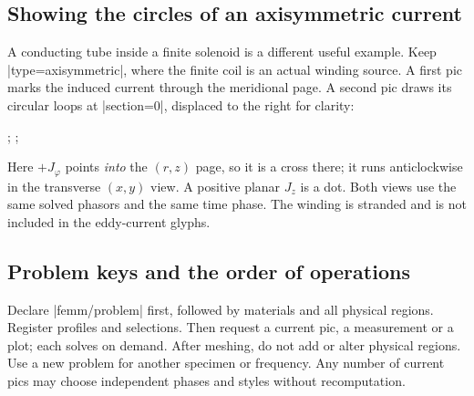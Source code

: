 \subsection{Showing the circles of an axisymmetric current}
A conducting tube inside a finite solenoid is a different useful example.
Keep |type=axisymmetric|, where the finite coil is an actual winding source.
A first pic marks the induced current through the meridional page. A second
pic draws its circular loops at |section=0|, displaced to the right for clarity:
\begin{codeexample}
;
;
\end{codeexample}
Here $+J_\varphi$ points \emph{into} the $(r,z)$ page, so it is a cross there;
it runs anticlockwise in the transverse $(x,y)$ view. A positive planar $J_z$
is a dot. Both views use the same solved phasors and the same time phase.
The winding is stranded and is not included in the eddy-current glyphs.

\subsection{Problem keys and the order of operations}
Declare |femm/problem| first, followed by materials and all physical regions.
Register profiles and selections. Then request a current pic, a measurement or
a plot; each solves on demand. After meshing, do not add or alter physical
regions. Use a new problem for another specimen or frequency. Any number of
current pics may choose independent phases and styles without recomputation.

